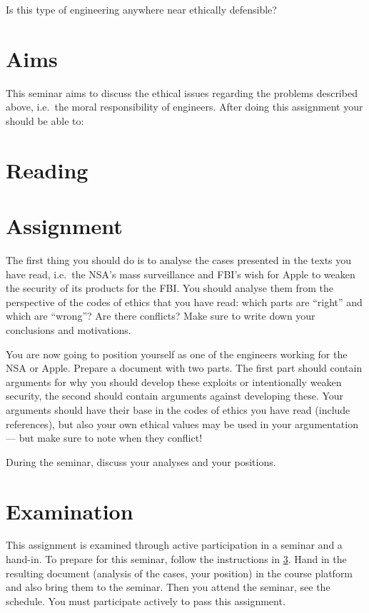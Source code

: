 \documentclass[a4paper]{article}
\begin{document}
Is this type of engineering anywhere near ethically defensible?


\section{Aims}

This seminar aims to discuss the ethical issues regarding the problems 
described above, i.e.\ the moral responsibility of engineers.
After doing this assignment your should be able to:
\begin{itemize}
	
\end{itemize}


\section{Reading}
\label{sec:Reading}



\section{Assignment}
\label{sec:Tasks}
The first thing you should do is to analyse the cases presented in the texts 
you have read, i.e.\ the NSA's mass surveillance and FBI's wish for Apple to 
weaken the security of its products for the FBI\@.
You should analyse them from the perspective of the codes of ethics that you 
have read: which parts are \enquote{right} and which are \enquote{wrong}?
Are there conflicts?
Make sure to write down your conclusions and motivations.

You are now going to position yourself as one of the engineers working for the 
NSA or Apple.
Prepare a document with two parts.
The first part should contain arguments for why you should develop these 
exploits or intentionally weaken security, the second should contain arguments 
against developing these.
Your arguments should have their base in the codes of ethics you have read 
(include references), but also your own ethical values may be used in your 
argumentation --- but make sure to note when they conflict!

During the seminar, discuss your analyses and your positions.


\section{Examination}
\label{sec:Examination}
This assignment is examined through active participation in a seminar and 
a hand-in.
To prepare for this seminar, follow the instructions in \cref{sec:Tasks}.
Hand in the resulting document (analysis of the cases, your position) in the 
course platform and also bring them to the seminar.
Then you attend the seminar, see the schedule.
You must participate actively to pass this assignment.


\printbibliography{}
\end{document}
